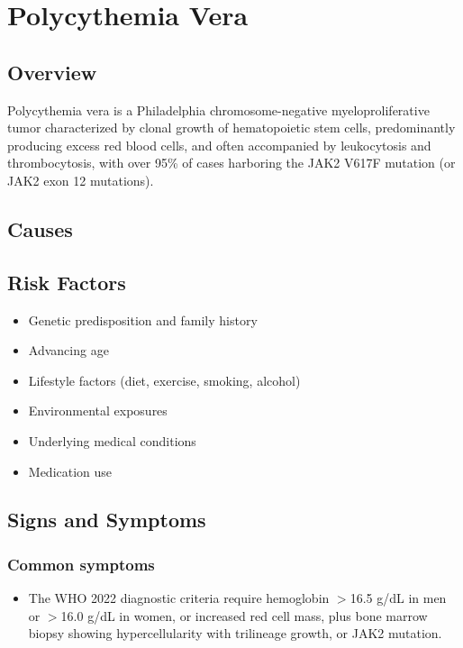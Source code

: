 \chapter{Polycythemia Vera}
\label{sec:Polycythemia Vera}

\section{Overview}
Polycythemia vera is a Philadelphia chromosome-negative myeloproliferative tumor characterized by clonal growth of hematopoietic stem cells, predominantly producing excess red blood cells, and often accompanied by leukocytosis and thrombocytosis, with over 95\% of cases harboring the JAK2 V617F mutation (or JAK2 exon 12 mutations).
\section{Causes}
\section{Risk Factors}

\begin{itemize}[noitemsep]
  \item Genetic predisposition and family history
  \item Advancing age
  \item Lifestyle factors (diet, exercise, smoking, alcohol)
  \item Environmental exposures
  \item Underlying medical conditions
  \item Medication use
\end{itemize}
\section{Signs and Symptoms}

\subsection{Common symptoms}
\begin{itemize}[noitemsep]
  \item The WHO 2022 diagnostic criteria require hemoglobin $>$16.5 g/dL in men or $>$16.0 g/dL in women, or increased red cell mass, plus bone marrow biopsy showing hypercellularity with trilineage growth, or JAK2 mutation. 
  \end{itemize}

